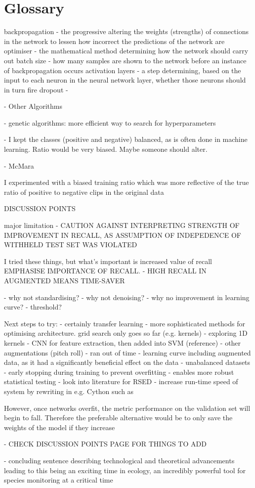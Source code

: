 \documentclass[11pt]{article}
\begin{document}
\section{Glossary}
backpropagation - the progressive altering the weights (strengths) of connections in the network to lessen how incorrect the predictions of the network are
optimiser - the mathematical method determining how the network should carry out 
batch size - how many samples are shown to the network before an instance of backpropagation occurs 
activation layers - a step determining, based on the input to each neuron in the neural network layer, whether those neurons should in turn fire
dropout - 

- Other Algorithms

- genetic algorithms: more efficient way to search for hyperparameters 

- I kept the classes (positive and negative) balanced, as is often done in machine learning. Ratio would be very biased. Maybe someone should alter. 

- McMara \cite{stkapor2017evaluating}

 I experimented with a biased training ratio which was more reflective of the true ratio of positive to negative clips in the original data


DISCUSSION POINTS

major limitation - CAUTION AGAINST INTERPRETING STRENGTH OF IMPROVEMENT IN RECALL, AS ASSUMPTION OF INDEPEDENCE OF WITHHELD TEST SET WAS VIOLATED 

I tried these things, but what's important is increased value of recall
EMPHASISE IMPORTANCE OF RECALL.
- HIGH RECALL IN AUGMENTED MEANS TIME-SAVER


- why not standardising?
- why not denoising?
- why no improvement in learning curve? - threshold?

Next steps to try:
- certainly transfer learning
- more sophisticated methods for optimising architecture. grid search only goes so far (e.g. kernels)
- exploring 1D kernels 
- CNN for feature extraction, then added into SVM (reference)
- other augmentations (pitch roll) - ran out of time
- learning curve including augmented data, as it had a significantly beneficial effect on the data
- unabalanced datasets
- early stopping during training to prevent overfitting - enables more robust statistical testing
- look into literature for RSED
- increase run-time speed of system by rewriting in e.g. Cython such as

However, once networks overfit, the metric performance on the validation set will begin to fall. Therefore the preferable alternative would be to only save the weights of the model if they increase

- CHECK DISCUSSION POINTS PAGE FOR THINGS TO ADD

- concluding sentence describing technological and theoretical advancements leading to this being an exciting time in ecology, an incredibly powerful tool for species monitoring at a critical time 



\end{document}
